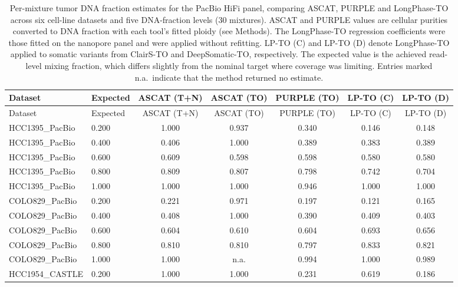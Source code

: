 \documentclass[pdflatex,sn-nature]{sn-jnl}
\begin{document}
\begin{small}
\begin{longtable}{@{}llccccc@{}}
  \caption[Tumor DNA fraction estimates for the PacBio HiFi panel]%
  {Per-mixture tumor DNA fraction estimates for the PacBio HiFi panel, comparing ASCAT, PURPLE and
  LongPhase-TO across six cell-line datasets and five DNA-fraction levels (30 mixtures). ASCAT and
  PURPLE values are cellular purities converted to DNA fraction with each tool's fitted ploidy (see Methods). The
  LongPhase-TO regression coefficients were those fitted on the nanopore panel and were applied
  without refitting. LP-TO (C) and LP-TO (D) denote LongPhase-TO applied to somatic variants from ClairS-TO and DeepSomatic-TO, respectively. The expected value is the achieved read-level mixing fraction, which differs slightly from the nominal target where coverage was limiting. Entries marked n.a.\ indicate that the method returned no estimate.}
  \label{tab:pacbio-tumor-purity}\\
  \toprule
  Dataset & Expected & ASCAT (T+N) & ASCAT (TO) & PURPLE (TO) & LP-TO (C) & LP-TO (D) \\
  \midrule
  \endfirsthead
  \toprule
  Dataset & Expected & ASCAT (T+N) & ASCAT (TO) & PURPLE (TO) & LP-TO (C) & LP-TO (D) \\
  \midrule
  \endhead
  \bottomrule
  \endlastfoot
  HCC1395\_PacBio & 0.200 & 1.000 & 0.937 & 0.340 & 0.146 & 0.148 \\
  HCC1395\_PacBio & 0.400 & 0.406 & 1.000 & 0.389 & 0.383 & 0.389 \\
  HCC1395\_PacBio & 0.600 & 0.609 & 0.598 & 0.598 & 0.580 & 0.580 \\
  HCC1395\_PacBio & 0.800 & 0.809 & 0.807 & 0.798 & 0.742 & 0.704 \\
  HCC1395\_PacBio & 1.000 & 1.000 & 1.000 & 0.946 & 1.000 & 1.000 \\
  \addlinespace
  COLO829\_PacBio & 0.200 & 0.221 & 0.971 & 0.197 & 0.121 & 0.165 \\
  COLO829\_PacBio & 0.400 & 0.408 & 1.000 & 0.390 & 0.409 & 0.403 \\
  COLO829\_PacBio & 0.600 & 0.604 & 0.610 & 0.604 & 0.693 & 0.656 \\
  COLO829\_PacBio & 0.800 & 0.810 & 0.810 & 0.797 & 0.833 & 0.821 \\
  COLO829\_PacBio & 1.000 & 1.000 & n.a. & 0.994 & 1.000 & 0.989 \\
  \addlinespace
  HCC1954\_CASTLE & 0.200 & 1.000 & 1.000 & 0.231 & 0.619 & 0.186 \\

\end{longtable}
\end{small}
\end{document}

